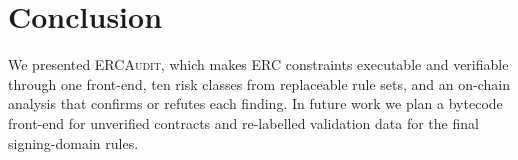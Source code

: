 \documentclass[10pt,conference]{IEEEtran}
\newcommand{\AS}[1]{\textcolor{orange}{#1}}
\newcommand{\tool}{\textsc{ERCAudit}\xspace}
\begin{document}
\begin{table}[tb]
\centering
\scriptsize
\caption{Comparison with related work. \CIRCLE: substantial coverage; \LEFTcircle: partial; \Circle: none. \AS{Marks follow each work's published scope; we did not re-run the tools.}}
\label{tab:related-work-comparison}
\setlength{\tabcolsep}{2pt}
\renewcommand{\arraystretch}{0.95}
\end{table}

\balance

\section{Conclusion}
We presented \tool{}, which makes ERC constraints executable and verifiable through one front-end, ten risk classes from replaceable rule sets, and an on-chain analysis that confirms or refutes each finding. In future work we plan a bytecode front-end for unverified contracts and re-labelled validation data for the final signing-domain rules.
\end{document}
